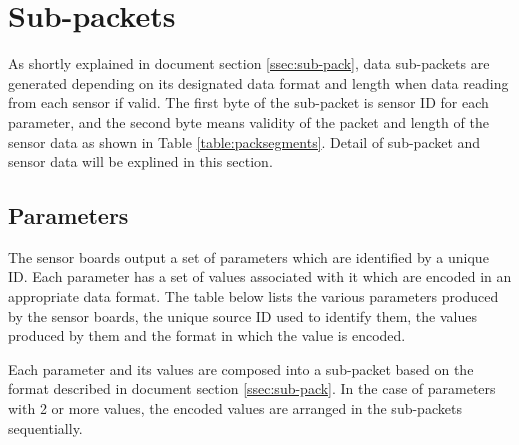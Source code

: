 \newpage
\section{Sub-packets}

As shortly explained in document section \ref{ssec:sub-pack}, data sub-packets are generated depending on its designated data format and length when data reading from each sensor if valid. The first byte of the sub-packet is sensor ID for each parameter, and the second byte means validity of the packet and length of the sensor data as shown in Table \ref{table:packsegments}. Detail of sub-packet and sensor data will be explined in this section.


\subsection{Parameters}

The sensor boards output a set of parameters which are identified by a unique ID. Each parameter
has a set of values associated with it which are encoded in an appropriate data format. The table
below lists the various parameters produced by the sensor boards, the unique source ID used to identify them, the values produced by them and the format in which the value is encoded.
\par
Each parameter and its values are composed into a sub-packet based on
the format described in document section \ref{ssec:sub-pack}.
In the case of parameters with 2 or more values, the encoded values are
arranged in the sub-packets sequentially. 


